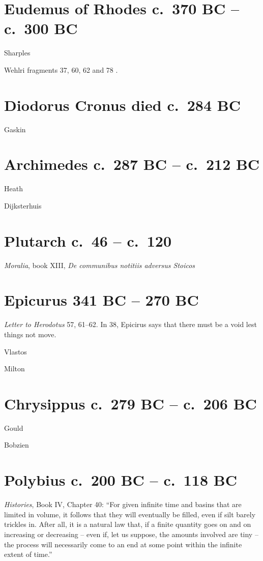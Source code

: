 \documentclass{amsart}
\theoremstyle{definition}
\begin{document}
\section{Eudemus of Rhodes c.~370 BC -- c.~300 BC}
Sharples \cite{eudemus}

Wehlri fragments 37, 60, 62 and 78 \cite{wehrliVIII}.

\section{Diodorus Cronus died c.~284 BC}
Gaskin \cite[pp.~60, 64, 108, 252, 260]{gaskin}


\section{Archimedes c.~287 BC -- c.~212 BC}
Heath \cite{heatharchimedes}

Dijksterhuis \cite{dijksterhuis}

\section{Plutarch c.~46 -- c.~120}
{\em Moralia}, book XIII, {\em De communibus notitiis adversus Stoicos} \cite{moraliaXIII}



\section{Epicurus 341 BC -- 270 BC}
{\em Letter to Herodotus} 57, 61--62. In 38, Epicirus says that there must be a void lest things not move.

Vlastos \cite{vlastos1965}

Milton \cite{milton}


\section{Chrysippus c.~279 BC -- c.~206 BC}
Gould \cite[pp.~112--119, chapter V, \S 1f]{gould}

Bobzien \cite{bobzien}


\section{Polybius c.~200 BC -- c.~118 BC}
{\em Histories}, Book IV, Chapter 40: ``For given infinite time and basins that are limited in volume,
it follows that they will eventually be filled, even if silt barely trickles in. After all, it is a natural law that,
if a finite quantity goes on and on increasing or decreasing -- even if, let us suppose, the amounts involved
are tiny -- the process will necessarily come to an end at some point within the infinite extent of time.''
\end{document}
